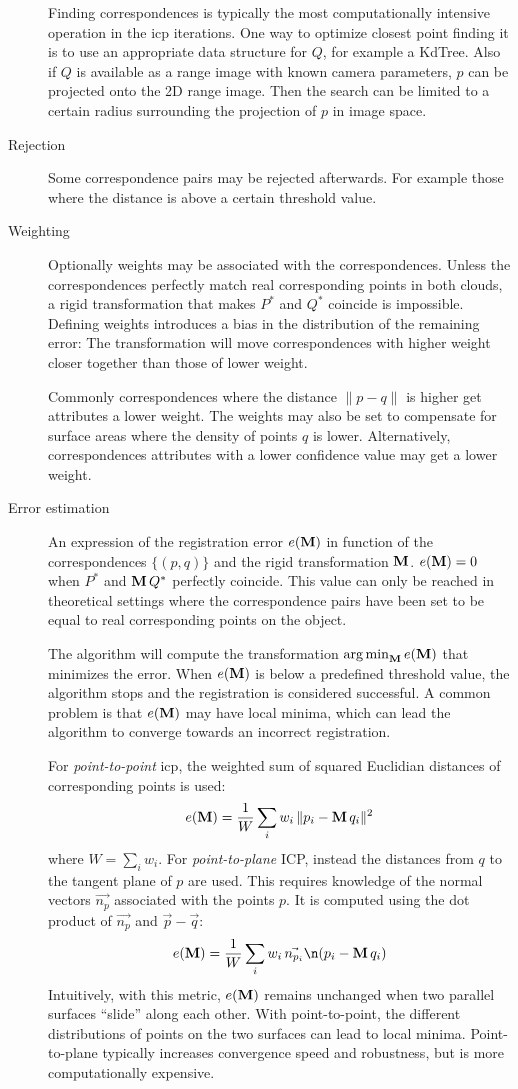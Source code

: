 \begin{description}
Finding correspondences is typically the most computationally intensive operation in the \gls{icp} iterations. One way to optimize closest point finding it is to use an appropriate data structure for $Q$, for example a KdTree. Also if $Q$ is available as a range image with known camera parameters, $p$ can be projected onto the 2D range image. Then the search can be limited to a certain radius surrounding the projection of $p$ in image space.
\item[Rejection] Some correspondence pairs may be rejected afterwards. For example those where the distance is above a certain threshold value.
\item[Weighting] Optionally weights may be associated with the correspondences. Unless the correspondences perfectly match real corresponding points in both clouds, a rigid transformation that makes $P^*$ and $Q^*$ coincide is impossible. Defining weights introduces a bias in the distribution of the remaining error: The transformation will move correspondences with higher weight closer together than those of lower weight.

Commonly correspondences where the distance $\| p - q \|$ is higher get attributes a lower weight. The weights may also be set to compensate for surface areas where the density of points $q$ is lower. Alternatively, correspondences attributes with a lower confidence value may get a lower weight.
\item[Error estimation] An expression of the registration error $e(\mathbf{M})$ in function of the correspondences $\{ (p, q) \}$ and the rigid transformation $\mathbf{M}$. $e(\mathbf{M}) = 0$ when $P^*$ and $\mathbf{M} \, Q^*$ perfectly coincide. This value can only be reached in theoretical settings where the correspondence pairs have been set to be equal to real corresponding points on the object.

The algorithm will compute the transformation $\operatorname*{arg\,min}_{\mathbf{M}} e(\mathbf{M})$ that minimizes the error. When $e(\mathbf{M})$ is below a predefined threshold value, the algorithm stops and the registration is considered successful. A common problem is that $e(\mathbf{M})$ may have local minima, which can lead the algorithm to converge towards an incorrect registration. 

For \emph{point-to-point} \gls{icp}, the weighted sum of squared Euclidian distances of corresponding points is used:
$$
e(\mathbf{M}) = \frac{1}{W} \sum_{i} w_i \, \| p_i - \mathbf{M} \, q_i \|^2
$$
where $W = \sum_i w_i$. For \emph{point-to-plane} ICP, instead the distances from $q$ to the tangent plane of $p$ are used. This requires knowledge of the normal vectors $\vec{n_p}$ associated with the points $p$. It is computed using the dot product of $\vec{n_p}$ and $\vec{p} - \vec{q}$:
$$
e(\matr{M}) = \frac{1}{W} \sum_{i} w_i \, \vec{n_{p_i}} \n (p_i - \matr{M} \, q_i)
$$
Intuitively, with this metric, $e(\mathbf{M})$ remains unchanged when two parallel surfaces ``slide'' along each other. With point-to-point, the different distributions of points on the two surfaces can lead to local minima. Point-to-plane typically increases convergence speed and robustness, but is more computationally expensive.


\end{description}

